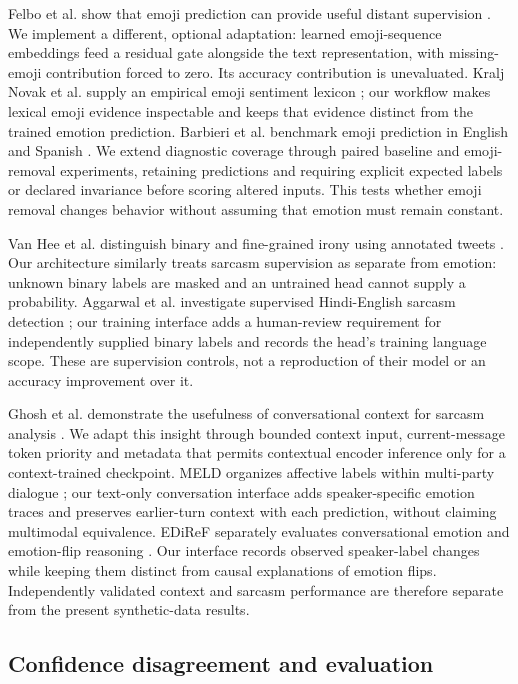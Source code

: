 \documentclass[conference]{IEEEtran}
\begin{document}
Felbo et al. show that emoji prediction can provide useful distant supervision \cite{felbo2017}. We implement a different, optional adaptation: learned emoji-sequence embeddings feed a residual gate alongside the text representation, with missing-emoji contribution forced to zero. Its accuracy contribution is unevaluated. Kralj Novak et al. supply an empirical emoji sentiment lexicon \cite{kraljnovak2015}; our workflow makes lexical emoji evidence inspectable and keeps that evidence distinct from the trained emotion prediction. Barbieri et al. benchmark emoji prediction in English and Spanish \cite{barbieri2018}. We extend diagnostic coverage through paired baseline and emoji-removal experiments, retaining predictions and requiring explicit expected labels or declared invariance before scoring altered inputs. This tests whether emoji removal changes behavior without assuming that emotion must remain constant.

Van Hee et al. distinguish binary and fine-grained irony using annotated tweets \cite{vanhee2018}. Our architecture similarly treats sarcasm supervision as separate from emotion: unknown binary labels are masked and an untrained head cannot supply a probability. Aggarwal et al. investigate supervised Hindi-English sarcasm detection \cite{aggarwal2020}; our training interface adds a human-review requirement for independently supplied binary labels and records the head's training language scope. These are supervision controls, not a reproduction of their model or an accuracy improvement over it.

Ghosh et al. demonstrate the usefulness of conversational context for sarcasm analysis \cite{ghosh2018}. We adapt this insight through bounded context input, current-message token priority and metadata that permits contextual encoder inference only for a context-trained checkpoint. MELD organizes affective labels within multi-party dialogue \cite{poria2019}; our text-only conversation interface adds speaker-specific emotion traces and preserves earlier-turn context with each prediction, without claiming multimodal equivalence. EDiReF separately evaluates conversational emotion and emotion-flip reasoning \cite{kumar2024}. Our interface records observed speaker-label changes while keeping them distinct from causal explanations of emotion flips. Independently validated context and sarcasm performance are therefore separate from the present synthetic-data results.

\subsection{Confidence disagreement and evaluation}
\end{document}
